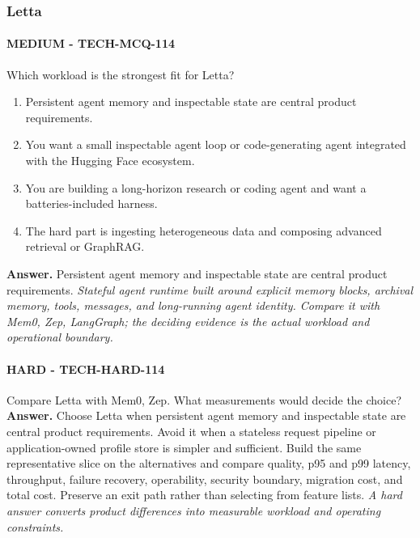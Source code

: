 \subsubsection*{Letta}
\paragraph{MEDIUM - TECH-MCQ-114} Which workload is the strongest fit for Letta?
\begin{enumerate}[label=\Alph*.]
\item Persistent agent memory and inspectable state are central product requirements.
\item You want a small inspectable agent loop or code-generating agent integrated with the Hugging Face ecosystem.
\item You are building a long-horizon research or coding agent and want a batteries-included harness.
\item The hard part is ingesting heterogeneous data and composing advanced retrieval or GraphRAG.
\end{enumerate}
\textbf{Answer.} Persistent agent memory and inspectable state are central product requirements.
\textit{Stateful agent runtime built around explicit memory blocks, archival memory, tools, messages, and long-running agent identity. Compare it with Mem0, Zep, LangGraph; the deciding evidence is the actual workload and operational boundary.}
\paragraph{HARD - TECH-HARD-114} Compare Letta with Mem0, Zep. What measurements would decide the choice?
\textbf{Answer.} Choose Letta when persistent agent memory and inspectable state are central product requirements. Avoid it when a stateless request pipeline or application-owned profile store is simpler and sufficient. Build the same representative slice on the alternatives and compare quality, p95 and p99 latency, throughput, failure recovery, operability, security boundary, migration cost, and total cost. Preserve an exit path rather than selecting from feature lists.
\textit{A hard answer converts product differences into measurable workload and operating constraints.}
